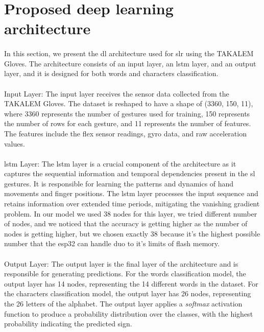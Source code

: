 \section{Proposed deep learning architecture}
\paragraph{}
In this section, we present the \ac{dl} architecture used for \ac{slr} using the TAKALEM Gloves. The architecture consists of an input layer, an \ac{lstm} layer, and an output layer, and it is designed for both words and characters classification.
\paragraph{}
Input Layer: The input layer receives the sensor data collected from the TAKALEM Gloves. The dataset is reshaped to have a shape of (3360, 150, 11), where 3360 represents the number of gestures used for training, 150 represents the number of rows for each gesture, and 11 represents the number of features. The features include the flex sensor readings, gyro data, and raw acceleration values.
\paragraph{}
\ac{lstm} Layer: The \ac{lstm} layer is a crucial component of the architecture as it captures the sequential information and temporal dependencies present in the \ac{sl} gestures. It is responsible for learning the patterns and dynamics of hand movements and finger positions. The \ac{lstm} layer processes the input sequence and retains information over extended time periods, mitigating the vanishing gradient problem. In our model we used 38 nodes for this layer, we tried different number of nodes, and we noticed that the accuracy is getting higher as the number of nodes is getting higher, but we chosen exactly 38 because it's the highest possible number that the esp32 can handle duo to it's limits of flash memory.
\paragraph{}
Output Layer: The output layer is the final layer of the architecture and is responsible for generating predictions. For the words classification model, the output layer has 14 nodes, representing the 14 different words in the dataset. For the characters classification model, the output layer has 26 nodes, representing the 26 letters of the alphabet. The output layer applies a \textit{softmax} activation function to produce a probability distribution over the classes, with the highest probability indicating the predicted sign.
